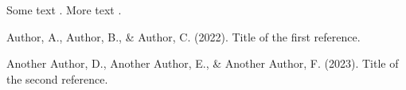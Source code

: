 \documentclass{article}
\begin{document}
Some text \citep{reference1}. More text \citep{reference2}.

\begin{thebibliography}{9}
Author, A., Author, B., \& Author, C. (2022). Title of the first reference.

Another Author, D., Another Author, E., \& Another Author, F. (2023). Title of the second reference.
\end{thebibliography}
\end{document}
